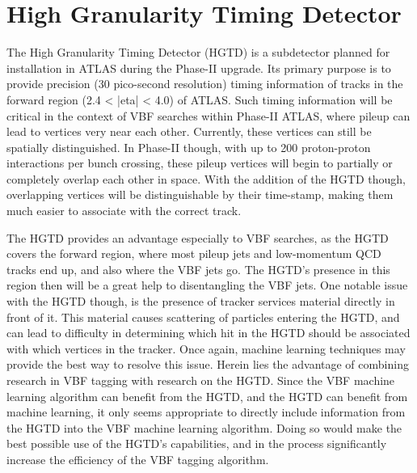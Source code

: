 \documentclass[12pt,letterpaper]{article}
\begin{document}
    
    



\section*{High Granularity Timing Detector}
    The High Granularity Timing Detector (HGTD) is a subdetector planned for installation in ATLAS during the Phase-II upgrade. Its primary purpose is to provide precision (30 pico-second resolution) timing information of tracks in the forward region (2.4 < |eta| < 4.0) of ATLAS. Such timing information will be critical in the context of VBF searches within Phase-II ATLAS, where pileup can lead to vertices very near each other. Currently, these vertices can still be spatially distinguished. In Phase-II though, with up to 200 proton-proton interactions per bunch crossing, these pileup vertices will begin to partially or completely overlap each other in space. With the addition of the HGTD though, overlapping vertices will be distinguishable by their time-stamp, making them much easier to associate with the correct track. 

    The HGTD provides an advantage especially to VBF searches, as the HGTD covers the forward region, where most pileup jets and low-momentum QCD tracks end up, and also where the VBF jets go. The HGTD's presence in this region then will be a great help to disentangling the VBF jets. One notable issue with the HGTD though, is the presence of tracker services material directly in front of it. This material causes scattering of particles entering the HGTD, and can lead to difficulty in determining which hit in the HGTD should be associated with which vertices in the tracker. Once again, machine learning techniques may provide the best way to resolve this issue. Herein lies the advantage of combining research in VBF tagging with research on the HGTD. Since the VBF machine learning algorithm can benefit from the HGTD, and the HGTD can benefit from machine learning, it only seems appropriate to directly include information from the HGTD into the VBF machine learning algorithm. Doing so would make the best possible use of the HGTD's capabilities, and in the process significantly increase the efficiency of the VBF tagging algorithm.
\end{document}
